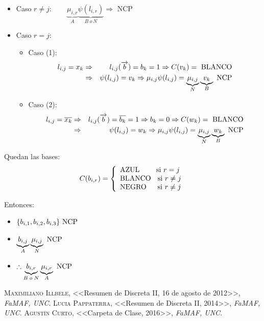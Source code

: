 \documentclass[12pt,a4paper]{report}
\newcounter{neq}
\begin{document}
				\begin{itemize}
					\item Caso $r \neq j : \qquad \underbrace{\mu_{i, r}}_{A} \underbrace{\psi(l_{i, r})}_{B \; o \, N} \Rightarrow$ NCP
					\item Caso $r = j$:
						\begin{itemize}
							\item Caso (1):
								\begin{eqnarray}
									\nonumber l_{i, j} = x_{k} &\Rightarrow & l_{i, j}(\overrightarrow{b}) = b_{k} = 1 \Rightarrow C(v_{k}) = \textup{ BLANCO} \\
									\nonumber &\Rightarrow& \psi(l_{i, j}) = v_{k}	\Rightarrow \mu_{i, j} \psi(l_{i, j}) = \underbrace{\mu_{i, j}}_{N} \underbrace{v_{k}}_{B} \textup{ NCP}
								\end{eqnarray}

							\item Caso (2):
								\begin{eqnarray}
										\nonumber l_{i, j} = \overline{x_{k}} &\Rightarrow & l_{i, j}(\overrightarrow{b}) = \overline{b_{k}} = 1 \Rightarrow b_{k} = 0 \Rightarrow C(w_{k}) = \textup{ BLANCO} \\
										\nonumber &\Rightarrow& \psi(l_{i, j}) = w_{k}	\Rightarrow \mu_{i, j} \psi(l_{i, j}) = \underbrace{\mu_{i, j}}_{N} \underbrace{w_{k}}_{B} \textup{ NCP}
								\end{eqnarray}
						\end{itemize}
				\end{itemize}

				\par Quedan las bases:
				\begin{equation*}
					C(b_{i, r}) =
				  \left\lbrace
		  		\begin{array}{l}
		    		\textup{AZUL \qquad si } r = j \\
		    		\textup{BLANCO \; si } r \neq j \\
		    		\textup{NEGRO \; \; si } r \neq j
		  		\end{array}
		 			\right.
				\end{equation*}

				\par Entonces:
				\begin{itemize}
					\item $\lbrace b_{i, 1}, b_{i, 2}, b_{i, 3} \rbrace \textup{ NCP}$
			 		\item $\underbrace{b_{i, j}}_{A} \underbrace{\mu_{i, j}}_{N} \textup{ NCP}$
			 		\item $\therefore \underbrace{b_{i, r}}_{B \; o \; N} \underbrace{\mu_{i, r}}_{A} \textup{ NCP}$
				\end{itemize}



\begin{thebibliography}{X}
 \textsc{Maximiliano Illbele},
<<Resumen de Discreta II, 16 de agosto de 2012>>,
\textit{FaMAF, UNC}.
 \textsc{Lucia Pappaterra},
<<Resumen de Discreta II, 2014>>,
\textit{FaMAF, UNC}.
 \textsc{Agustín Curto},
<<Carpeta de Clase, 2016>>,
\textit{FaMAF, UNC}.
\end{thebibliography}
\end{document}

